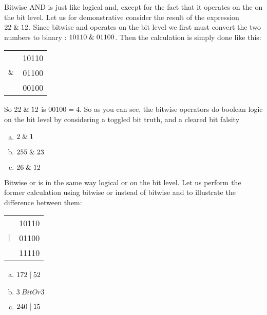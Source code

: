 Bitwise AND is just like logical and, except for the fact that it
operates on the on the bit level. Let us for demonstrative consider
the result of the expression $22 \mathrel{\&} 12$. Since bitwise and
operates on the bit level we first must convert the two numbers to
binary : $10110 \mathrel{\&} 01100$. Then the calculation is simply done
like this:

\begin{center}
  \begin{tabular}{lr}
    & 10110  \\
    $\mathrel{\&}$ & 01100 \\
    \hline
    & 00100 \\
  \end{tabular}
\end{center}

So $22 \mathrel{\&} 12$ is $00100=4$. So as you can see, the bitwise
operators do boolean logic on the bit level by considering a toggled
bit truth, and a cleared bit falsity

\begin{Exercise}[label={bitand}]
  \begin{enumerate}[(a)]
  \item $2 \mathrel{\&} 1$
  \item $255 \mathrel{\&} 23$
  \item $26 \mathrel{\&} 12$
  \end{enumerate}
\end{Exercise}

Bitwise or is in the same way logical or on the bit level. Let us
perform the former calculation using bitwise or instead of bitwise and
to illustrate the difference between them:

\begin{center}
  \begin{tabular}{lr}
    & 10110  \\
    $\mathrel{|}$ & 01100 \\
    \hline
    & 11110 \\
  \end{tabular}
\end{center}

\begin{Exercise}[label={bitor}]
  \begin{enumerate}[(a)]
  \item $172 \mathrel{|} 52$
  \item $3 \ BitOr 3$
  \item $240 \mathrel{|} 15$
  \end{enumerate}
\end{Exercise}

